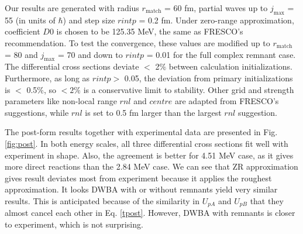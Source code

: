 Our results are generated with radius $r_{\mathrm{match}}$ = 60 fm, partial waves up to $j_{\max}$ = 55 (in units of $\hbar$) and step size $rintp$ = 0.2 fm. 
Under zero-range approximation, coefficient $D0$ is chosen to be 125.35 MeV, the same as FRESCO's recommendation. 
To test the convergence, these values are modified up to $r_{\mathrm{match}}$ = 80 and $j_{\max}$ = 70 and down to $rintp$ = 0.01 for the full complex remnant case.
 The differential cross sections deviate $<$ 2$\%$  between calculation initializations. 
 Furthermore, as long as $rintp >$ 0.05, the deviation from primary initializations is $<$ 0.5$\%$, so $< 2\%$ is a conservative limit to stability. 
 Other grid and strength parameters like non-local range $rnl$ and $centre$ are adapted from FRESCO's suggestions,
while $rnl$ is set to 0.5 fm larger than the largest $rnl$ suggestion.

The post-form results together with experimental data \cite{PhysRev.101.209} are presented in Fig. \ref{fig:post}.
In both energy scales, all three differential cross sections fit well with experiment in shape. 
Also, the agreement is better for 4.51 MeV case, as it gives more direct reactions than the 2.84 MeV case.
We can see that ZR approximation gives result deviates most from experiment because it applies the roughest approximation.
It looks DWBA with or without remnants yield very similar results.
This is anticipated because of the similarity in $U_{pA}$ and $U_{pB}$ that they almost cancel each other in Eq. \ref{tpost}.
However, DWBA with remnants is closer to experiment, which is not surprising. 